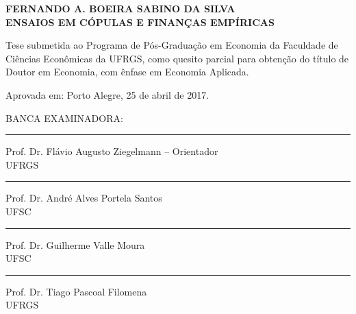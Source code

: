 \documentclass[a4paper,12pt]{report}
\begin{document}
	
	
	
	\begin{titlepage}
		\singlespacing
		\setlength{\baselineskip}{24pt}
		\centering
		\large {
			
			\textbf{FERNANDO A. BOEIRA SABINO DA SILVA} \\ [2cm]
			
			
			\textbf{ENSAIOS EM CÓPULAS E FINANÇAS EMPÍRICAS} \\ [1.5cm]
			
			
			
			\hfill
			\hspace{.45\textwidth}
			\begin{minipage}{.5\textwidth}
				\singlespacing
				Tese submetida ao Programa de Pós-Graduação em Economia da Faculdade de Ciências Econômicas da UFRGS, como quesito parcial para obtenção do
				título de Doutor em Economia, com ênfase em Economia Aplicada.  \\ [1cm]
			\end{minipage}
			
			
			\begin{flushleft}
			\noindent
			Aprovada em: Porto Alegre, 25 de abril de 2017.\\
			\vspace{1.5cm}
			
			\noindent
			BANCA EXAMINADORA:\\
			
			\vspace{4pt}
			\noindent
			\rule{\textwidth}{1pt}
			Prof. Dr. Flávio Augusto Ziegelmann -- Orientador\\
			UFRGS\\
			
			\vspace{4pt}
			\noindent
			\rule{\textwidth}{1pt}
			Prof. Dr. André Alves Portela Santos\\
			UFSC\\
			
			\vspace{4pt}
			\noindent
			\rule{\textwidth}{1pt}
			Prof. Dr. Guilherme Valle Moura\\
			UFSC\\
			
			\vspace{4pt}
			\noindent
			\rule{\textwidth}{1pt}
			Prof. Dr. Tiago Pascoal Filomena\\
			UFRGS\\
			
			\end{flushleft}
			
}		
	\end{titlepage}
	
\end{document}
